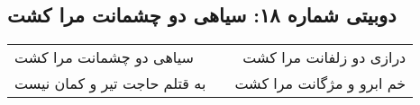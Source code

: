 \begin{center}
\section*{دوبیتی شماره ۱۸: سیاهی دو چشمانت مرا کشت}
\label{sec:018}
\begin{longtable}{l p{0.5cm} r}
سیاهی دو چشمانت مرا کشت
&&
درازی دو زلفانت مرا کشت
\\
به قتلم حاجت تیر و کمان نیست
&&
خم ابرو و مژگانت مرا کشت
\\
\end{longtable}
\end{center}
